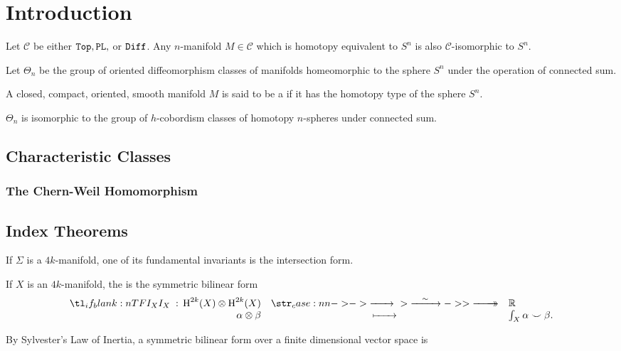 \chapter{Introduction}


\begin{conjecture}\label{conj:generalized_poincare} Let $\mathscr{C}$ be either $\mathtt{Top}, \mathtt{PL},$ or $\mathtt{Diff}$. Any $n$-manifold $M\in \mathscr{C}$ which is homotopy equivalent to $S^n$ is also $\mathscr{C}$-isomorphic to $S^n$.
\end{conjecture}

\begin{definition}
  Let $\Theta_n$ be the group of oriented diffeomorphism classes of manifolds homeomorphic to the sphere $S^n$ under the operation of connected sum.
\end{definition}

\begin{definition}
  A closed, compact, oriented, smooth manifold $M$ is said to be a  if it has the homotopy type of the sphere $S^n$.
\end{definition}

\begin{theorem}
  $\Theta_n$ is isomorphic to the group of $h$-cobordism classes of homotopy $n$-spheres under connected sum.
\end{theorem}

\section{Characteristic Classes}\label{sec:characteristic_classes}

\subsection*{The Chern-Weil Homomorphism}

\section{Index Theorems}\label{sec:index_theorems}

If $\Sigma$ is a $4k$-manifold, one of its fundamental invariants is the intersection form. 
\begin{definition}
	If $X$ is an $4k$-manifold, the  is the symmetric bilinear form
	\[
		\lkxfunc{I_{X}}{\H^{2k}(X)\otimes \H^{2k}(X)}
		{\R}{\alpha\otimes \beta}{\int_X \alpha\smile \beta.}
	\]
\end{definition}
By Sylvester's Law of Inertia, a symmetric bilinear form over a finite dimensional vector space is 

